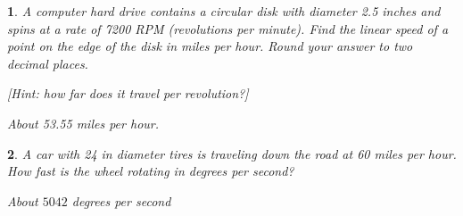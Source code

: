 \documentclass{amsbook}
\newtheorem{exc}{}
\newenvironment{ex}{\begin{exc}\normalfont}{\end{exc}}
\numberwithin{section}{chapter}
\numberwithin{equation}{chapter}
\begin{document}
\begin{comment}
\begin{ex}
A yo-yo which is 2.25 inched in diameter spins at a rate of 4500 revolutions per minute. How fast is the edge of the yo-yo spinning in miles per hour? Round your answer to two decimal places.
\begin{sol}
About 30.12 miles per hour.
\end{sol}
\end{ex}
\end{comment}



\begin{ex} \label{7200rpm}
	A computer hard drive contains a circular disk with diameter 2.5 inches and spins at a rate of 7200 RPM (revolutions per minute). Find the linear speed of a point on the edge of the disk in miles per hour. Round your answer to two decimal places.
	
	[Hint: how far does it travel per revolution?]
	\begin{sol}
		About 53.55 miles per hour.
	\end{sol}
\end{ex}

\begin{ex}
A car with 24 in diameter tires is traveling down the road at 60 miles per hour. How fast is the wheel rotating in degrees per second?
	\begin{sol}
		About $5042$ degrees per second
	\end{sol}
\end{ex}
\end{document}

